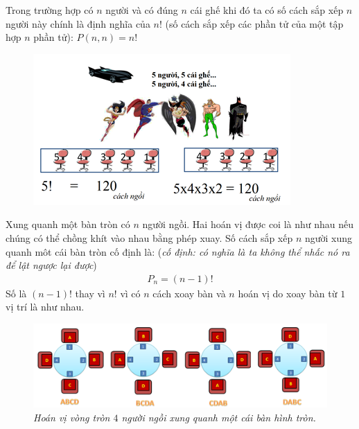 \begin{multicols}{2}
	\vskip 0.1cm
	Trong trường hợp có $n$ người và có đúng $n$ cái ghế khi đó ta có số cách sắp xếp $n$ người này chính là định nghĩa của $n!$ (số cách sắp xếp các phần tử của một tập hợp $n$ phần tử): $P(n,n)=n!$
	\begin{figure}[H]
		\centering
		\vspace*{-10pt}
		\captionsetup{labelformat=empty, justification=centering}
		\includegraphics[width=1\linewidth]{_4}
		\vspace*{-15pt}
	\end{figure}
	 Xung quanh một bàn tròn có $n$ người ngồi. Hai hoán vị được coi là như nhau nếu chúng có thể chồng khít vào nhau bằng phép xuay. Số cách sắp xếp $n$ người xung quanh môt cái bàn tròn cố định là: (\textit{cố định: có nghĩa là ta không thể nhấc nó ra để lật ngược lại được})
	\begin{align*}
		P_n=(n-1)!
	\end{align*}
	Số là $(n-1)!$ thay vì $n!$ vì có $n$ cách xoay bàn và $n$ hoán vị do xoay bàn từ $1$ vị trí là như nhau.
	\begin{figure}[H]
		\centering
		\vspace*{-5pt}
		\captionsetup{labelformat=empty, justification=centering}
		\includegraphics[width=1\linewidth]{_5}
		\caption{\small\textit{\color{toancuabi}Hoán vị vòng tròn $4$ người ngồi xung quanh một cái bàn hình tròn.}}

\end{figure}
\end{multicols}
